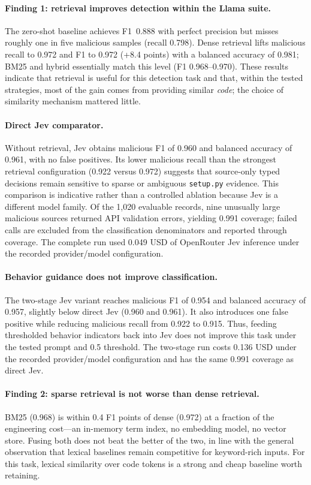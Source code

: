 \paragraph{Finding 1: retrieval improves detection within the Llama suite.}
The zero-shot baseline achieves F1~0.888 with perfect precision but misses
roughly one in five malicious samples (recall 0.798). Dense retrieval lifts
malicious recall to 0.972 and F1 to 0.972 (+8.4 points) with a balanced
accuracy of 0.981; BM25 and hybrid essentially match this level (F1
0.968--0.970). These results indicate that retrieval is useful for this
detection task and that, within the tested strategies, most of the gain comes
from providing similar \emph{code}; the choice of similarity mechanism
mattered little.

\paragraph{Direct Jev comparator.} Without retrieval, Jev obtains malicious F1
of 0.960 and balanced accuracy of 0.961, with no false positives. Its lower
malicious recall than the strongest retrieval configuration (0.922 versus
0.972) suggests that source-only typed decisions remain sensitive to sparse or
ambiguous \texttt{setup.py} evidence. This comparison is indicative rather
than a controlled ablation because Jev is a different model family. Of the
1{,}020 evaluable records, nine unusually large malicious sources returned API
validation errors, yielding 0.991 coverage; failed calls are excluded from the
classification denominators and reported through coverage. The complete run
used 0.049 USD of OpenRouter Jev inference under the recorded provider/model
configuration.

\paragraph{Behavior guidance does not improve classification.} The two-stage
Jev variant reaches malicious F1 of 0.954 and balanced accuracy of 0.957,
slightly below direct Jev (0.960 and 0.961). It also introduces one false
positive while reducing malicious recall from 0.922 to 0.915. Thus, feeding
thresholded behavior indicators back into Jev does not improve this task under
the tested prompt and 0.5 threshold. The two-stage run costs 0.136 USD under
the recorded provider/model configuration and has the same 0.991 coverage as
direct Jev.

\paragraph{Finding 2: sparse retrieval is not worse than dense retrieval.}
BM25 (0.968) is within 0.4 F1 points of dense (0.972) at a fraction of the
engineering cost---an in-memory term index, no embedding model, no vector
store. Fusing both does not beat the better of the two, in line with the
general observation that lexical baselines remain competitive for
keyword-rich inputs. For this task, lexical similarity over code tokens is a
strong and cheap baseline worth retaining.

